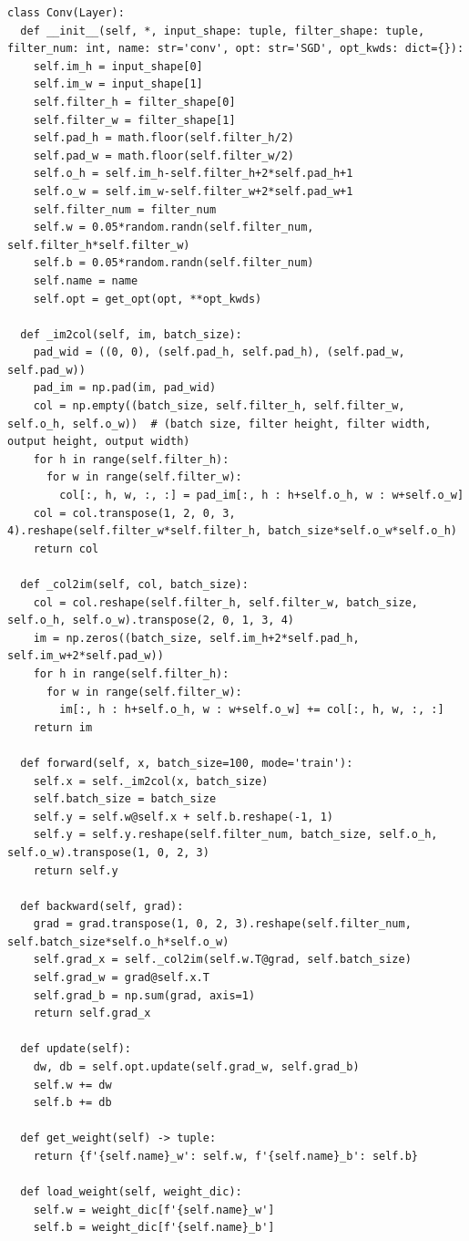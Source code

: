 \documentclass[platex,dvipdfmx]{jsarticle}
\begin{document}
\begin{lstlisting}[caption=ex\_advanced.py, label=Conv]
class Conv(Layer):
  def __init__(self, *, input_shape: tuple, filter_shape: tuple, filter_num: int, name: str='conv', opt: str='SGD', opt_kwds: dict={}):
    self.im_h = input_shape[0]
    self.im_w = input_shape[1]
    self.filter_h = filter_shape[0]
    self.filter_w = filter_shape[1]
    self.pad_h = math.floor(self.filter_h/2)
    self.pad_w = math.floor(self.filter_w/2)
    self.o_h = self.im_h-self.filter_h+2*self.pad_h+1
    self.o_w = self.im_w-self.filter_w+2*self.pad_w+1
    self.filter_num = filter_num
    self.w = 0.05*random.randn(self.filter_num, self.filter_h*self.filter_w)
    self.b = 0.05*random.randn(self.filter_num)
    self.name = name
    self.opt = get_opt(opt, **opt_kwds)

  def _im2col(self, im, batch_size):
    pad_wid = ((0, 0), (self.pad_h, self.pad_h), (self.pad_w, self.pad_w))
    pad_im = np.pad(im, pad_wid)
    col = np.empty((batch_size, self.filter_h, self.filter_w, self.o_h, self.o_w))  # (batch size, filter height, filter width, output height, output width)
    for h in range(self.filter_h):
      for w in range(self.filter_w):
        col[:, h, w, :, :] = pad_im[:, h : h+self.o_h, w : w+self.o_w]
    col = col.transpose(1, 2, 0, 3, 4).reshape(self.filter_w*self.filter_h, batch_size*self.o_w*self.o_h)
    return col

  def _col2im(self, col, batch_size):
    col = col.reshape(self.filter_h, self.filter_w, batch_size, self.o_h, self.o_w).transpose(2, 0, 1, 3, 4)
    im = np.zeros((batch_size, self.im_h+2*self.pad_h, self.im_w+2*self.pad_w))
    for h in range(self.filter_h):
      for w in range(self.filter_w):
        im[:, h : h+self.o_h, w : w+self.o_w] += col[:, h, w, :, :]
    return im

  def forward(self, x, batch_size=100, mode='train'):
    self.x = self._im2col(x, batch_size)
    self.batch_size = batch_size
    self.y = self.w@self.x + self.b.reshape(-1, 1)
    self.y = self.y.reshape(self.filter_num, batch_size, self.o_h, self.o_w).transpose(1, 0, 2, 3)
    return self.y

  def backward(self, grad):
    grad = grad.transpose(1, 0, 2, 3).reshape(self.filter_num, self.batch_size*self.o_h*self.o_w)
    self.grad_x = self._col2im(self.w.T@grad, self.batch_size)
    self.grad_w = grad@self.x.T
    self.grad_b = np.sum(grad, axis=1)
    return self.grad_x

  def update(self):
    dw, db = self.opt.update(self.grad_w, self.grad_b)
    self.w += dw
    self.b += db

  def get_weight(self) -> tuple:
    return {f'{self.name}_w': self.w, f'{self.name}_b': self.b}

  def load_weight(self, weight_dic):
    self.w = weight_dic[f'{self.name}_w']
    self.b = weight_dic[f'{self.name}_b']
\end{lstlisting}
\end{document}
